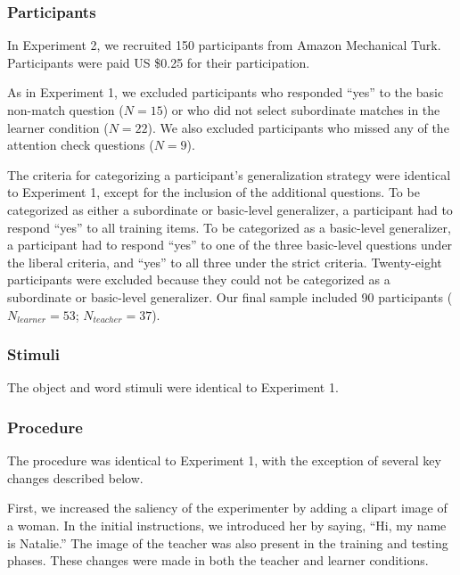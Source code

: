 \documentclass[man]{apa2}
\begin{document}
\subsubsection{Participants} In Experiment 2, we recruited 150 participants from Amazon Mechanical Turk. Participants were paid US \$0.25 for their participation.

As in Experiment 1, we excluded participants who responded ``yes'' to the basic non-match question ($N=15$) or who did not select subordinate matches in the learner condition ($N = 22$). We also excluded participants who missed any of the attention check questions ($N = 9$).

The criteria for categorizing a participant's generalization strategy were identical to Experiment 1, except for the inclusion of the additional questions. To be categorized as either a subordinate or basic-level generalizer, a participant had to respond ``yes'' to all training items. To be categorized as a basic-level generalizer, a participant had to respond ``yes'' to one of the three basic-level questions under the liberal criteria, and ``yes'' to all three under the strict criteria. Twenty-eight participants were excluded because they could not be categorized as a subordinate or basic-level generalizer.  Our final sample included 90 participants ($N_{learner} = 53$; $N_{teacher} = 37$).


\subsubsection{Stimuli}
The object and word stimuli were identical to Experiment 1.

\subsubsection{Procedure}
The procedure was identical to Experiment 1, with the exception of several key changes described below.

First, we increased the saliency of the experimenter by adding a clipart image of a woman. In the initial instructions, we introduced her by saying, ``Hi, my name is Natalie.'' The image of the teacher was also present in the training and testing phases. These changes were made in both the teacher and learner conditions.
\end{document}
